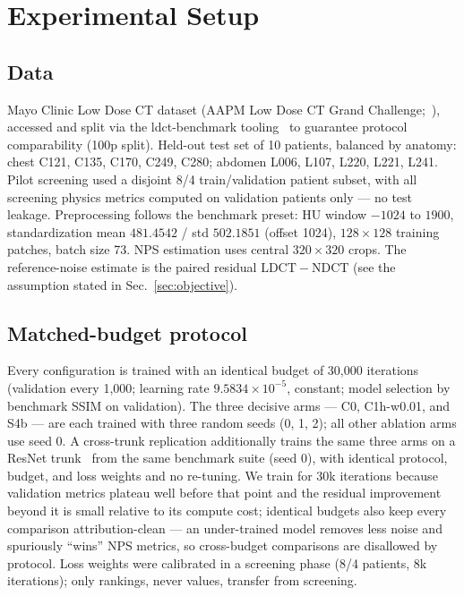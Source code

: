 \section{Experimental Setup}
\label{sec:setup}

\subsection{Data}
\label{sec:data}

Mayo Clinic Low Dose CT dataset (AAPM Low Dose CT Grand Challenge;~\cite{mccollough2017}), accessed and split via the ldct-benchmark tooling~\cite{eulig2024} to guarantee protocol comparability (100p split). Held-out test set of 10 patients, balanced by anatomy: chest C121, C135, C170, C249, C280; abdomen L006, L107, L220, L221, L241. Pilot screening used a disjoint 8/4 train/validation patient subset, with all screening physics metrics computed on validation patients only --- no test leakage. Preprocessing follows the benchmark preset: HU window $-1024$ to $1900$, standardization mean $481.4542$ / std $502.1851$ (offset 1024), $128 \times 128$ training patches, batch size 73. NPS estimation uses central $320 \times 320$ crops. The reference-noise estimate is the paired residual $\mathrm{LDCT} - \mathrm{NDCT}$ (see the assumption stated in Sec.~\ref{sec:objective}).

\subsection{Matched-budget protocol}
\label{sec:protocol}

Every configuration is trained with an identical budget of 30{,}000 iterations (validation every 1{,}000; learning rate $9.5834 \times 10^{-5}$, constant; model selection by benchmark SSIM on validation). The three decisive arms --- C0, C1h-w0.01, and S4b --- are each trained with three random seeds (0, 1, 2); all other ablation arms use seed 0. A cross-trunk replication additionally trains the same three arms on a ResNet trunk~\cite{he2016} from the same benchmark suite (seed 0), with identical protocol, budget, and loss weights and no re-tuning. We train for 30k iterations because validation metrics plateau well before that point and the residual improvement beyond it is small relative to its compute cost; identical budgets also keep every comparison attribution-clean --- an under-trained model removes less noise and spuriously ``wins'' NPS metrics, so cross-budget comparisons are disallowed by protocol. Loss weights were calibrated in a screening phase (8/4 patients, 8k iterations); only rankings, never values, transfer from screening.

